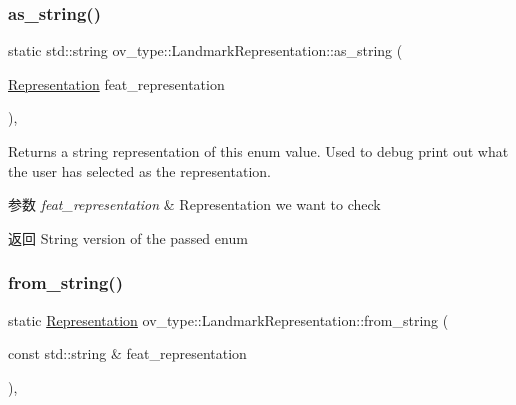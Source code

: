 \subsubsection{\texorpdfstring{as\+\_\+string()}{as\_string()}}
{\footnotesize\ttfamily static std\+::string ov\+\_\+type\+::\+Landmark\+Representation\+::as\+\_\+string (\begin{DoxyParamCaption}\item[{\hyperlink{classov__type_1_1LandmarkRepresentation_a7f5783df6932ace7f098ae243b6d298e}{Representation}}]{feat\+\_\+representation }\end{DoxyParamCaption})\hspace{0.3cm}{\ttfamily [inline]}, {\ttfamily [static]}}



Returns a string representation of this enum value. Used to debug print out what the user has selected as the representation. 


\begin{DoxyParams}{参数}
{\em feat\+\_\+representation} & Representation we want to check \\
\hline
\end{DoxyParams}
\begin{DoxyReturn}{返回}
String version of the passed enum 
\end{DoxyReturn}
\mbox{\label{classov__type_1_1LandmarkRepresentation_a730830f7d0235f40f4266d0a66895e50}} 
\subsubsection{\texorpdfstring{from\+\_\+string()}{from\_string()}}
{\footnotesize\ttfamily static \hyperlink{classov__type_1_1LandmarkRepresentation_a7f5783df6932ace7f098ae243b6d298e}{Representation} ov\+\_\+type\+::\+Landmark\+Representation\+::from\+\_\+string (\begin{DoxyParamCaption}\item[{const std\+::string \&}]{feat\+\_\+representation }\end{DoxyParamCaption})\hspace{0.3cm}{\ttfamily [inline]}, {\ttfamily [static]}}




